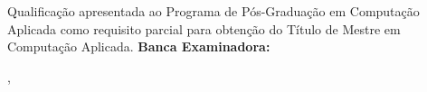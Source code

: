 \begin{folhadeaprovacao}

	\begin{center}
		{\ABNTEXchapterfont\bfseries\imprimirautor}
		\vspace{6em}

			\ABNTEXchapterfont\bfseries\imprimirtitulo

	\end{center}
		\vspace{1em}
		{\justify
		Qualificação apresentada ao Programa de Pós-Graduação em Computação Aplicada como requisito parcial para obtenção do
    Título de Mestre em Computação Aplicada.}
	\vspace{3em}
	\noindent
	{\bfseries Banca Examinadora:}

    \vspace*{\fill}
    \begin{center}
    	\imprimirlocal,\,\imprimirfulldata
    \end{center}
\end{folhadeaprovacao}





